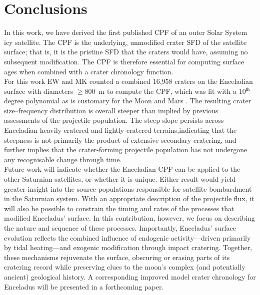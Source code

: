 \documentclass[preprint,11pt,3p,times,authoryear]{elsarticle}
\begin{document}
\section{Conclusions}
\label{sect:conclusion}
In this work, we have derived the first published CPF of an outer Solar System icy satellite. The CPF is the underlying, unmodified crater SFD of the satellite surface; that is, it is the pristine SFD that the craters would have, assuming no subsequent modification. The CPF is therefore essential for computing surface ages when combined with a crater chronology function. \\

For this work EW and MK counted a combined 16,958 craters on the Enceladian surface with diameters $\ge$800~m to compute the CPF, which was fit with a 10$^{\rm th}$ degree polynomial as is customary for the Moon and Mars \citep{Neukum1975, Neukum2001,Ivanov2001}.
The resulting crater size–frequency distribution is overall steeper than implied by previous assessments of the projectile population. The steep slope persists across Enceladian heavily-cratered and lightly-cratered terrains,indicating that the steepness is not primarily the product of extensive secondary cratering, and further implies that the crater-forming projectile population has not undergone any recognisable change through time.\\

Future work will indicate whether the Enceladian CPF can be applied to the other Saturnian satellites, or whether it is unique. Either result would yield greater insight into the source populations responsible for satellite bombardment in the Saturnian system.
With an appropriate description of the projectile flux, it will also be possible to constrain the timing and rates of the processes that modified Enceladus’ surface. In this contribution, however, we focus on describing the nature and sequence of these processes. Importantly, Enceladus’ surface evolution reflects the combined influence of endogenic activity—driven primarily by tidal heating—and exogenic modification through impact cratering. Together, these mechanisms rejuvenate the surface, obscuring or erasing parts of its cratering record while preserving clues to the moon’s complex (and potentially ancient) geological history. A corresponding improved model crater chronology for Enceladus will be presented in a forthcoming paper.
\end{document}
